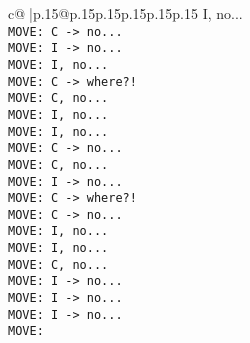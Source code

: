 \documentclass{article}
\begin{document}
{\begin{supertabular}{c@{$\;$}|p{.15\linewidth}@{}p{.15\linewidth}p{.15\linewidth}p{.15\linewidth}p{.15\linewidth}p{.15\linewidth}}
{{{I, no...\\ \tt  MOVE: C -> no...\\ \tt  MOVE: I -> no...\\ \tt  MOVE: I, no...\\ \tt  MOVE: C -> where?!\\ \tt  MOVE: C, no...\\ \tt  MOVE: I, no...\\ \tt  MOVE: I, no...\\ \tt  MOVE: C -> no...\\ \tt  MOVE: C, no...\\ \tt  MOVE: I -> no...\\ \tt  MOVE: C -> where?!\\ \tt  MOVE: C -> no...\\ \tt  MOVE: I, no...\\ \tt  MOVE: I, no...\\ \tt  MOVE: C, no...\\ \tt  MOVE: I -> no...\\ \tt  MOVE: I -> no...\\ \tt  MOVE: I -> no...\\ \tt  MOVE:}}}
\end{supertabular}}
\end{document}

